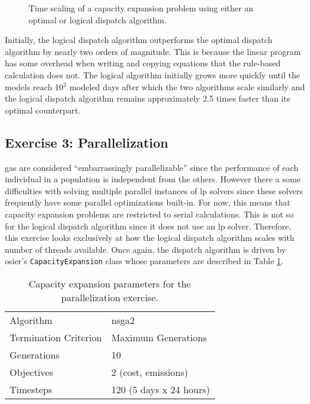 \begin{figure}[htbp!]
    \centering
    \resizebox{0.75\columnwidth}{!}{}
    \caption{Time scaling of a capacity expansion problem using either an optimal or logical dispatch algorithm.}
    \label{fig:alg-scaling}
\end{figure}

\noindent Initially, the logical dispatch algorithm outperforms the optimal
dispatch algorithm by nearly two orders of magnitude. This is because the linear
program has some overhead when writing and copying equations that the rule-based
calculation does not. The logical algorithm initially grows more quickly until
the models reach 10$^2$ modeled days after which the two algorithms scale
similarly and the logical dispatch algorithm remains approximately 2.5 times
faster than its optimal counterpart.

\subsection{Exercise 3: Parallelization}

\acp{ga} are considered ``embarrassingly parallelizable'' since the performance
of each individual in a population is independent from the others. However there
a some difficulties with solving multiple parallel instances of \ac{lp} solvers
since these solvers frequently have some parallel optimizations built-in. For
now, this means that capacity expansion problems are restricted to serial
calculations. This is not so for the logical dispatch algorithm since it does
not use an \ac{lp} solver. Therefore, this exercise looks exclusively at how the
logical dispatch algorithm scales with number of threads available. Once again,
the dispatch algorithm is driven by \ac{osier}'s \texttt{CapacityExpansion}
class whose parameters are described in Table \ref{tab:thread-scaling-params}. 

\begin{table}[htbp!]
    \centering
    \caption{Capacity expansion parameters for the parallelization exercise.}
    \label{tab:thread-scaling-params}
    \begin{tabular}{ll}
        \toprule
        Algorithm & \acs{nsga2}\\
        Termination Criterion & Maximum Generations\\
        Generations & 10 \\
        Objectives & 2 (cost, emissions)\\
        Timesteps & 120 (5 days x 24 hours)\\
        \bottomrule
    \end{tabular}
\end{table}

